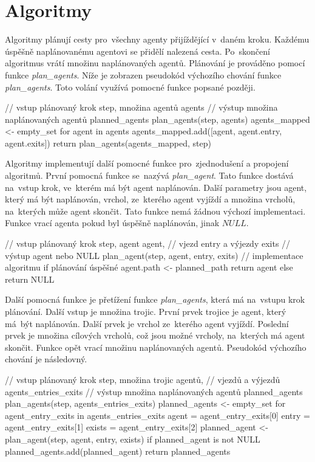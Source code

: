 \chapter{Algoritmy}\label{ch:algoritmy}

Algoritmy plánují cesty pro~všechny agenty přijíždějící v~daném kroku.
Každému úspěšně naplánovanému agentovi se přidělí nalezená cesta.
Po~skončení algoritmus vrátí množinu naplánovaných agentů.
Plánování je prováděno pomocí funkce \emph{plan\_agents}.
Níže je zobrazen pseudokód výchozího chování funkce \emph{plan\_agents}.
Toto volání využívá pomocné funkce popsané později.
\begin{code}[xrightmargin=6em]
// vstup plánovaný krok step, množina agentů agents
// výstup množina naplánovaných agentů planned_agents
plan_agents(step, agents)
    agents_mapped <- empty_set
    for agent in agents
      agents_mapped.add([agent, agent.entry, agent.exits])
    return plan_agents(agents_mapped, step)
\end{code}

Algoritmy implementují další pomocné funkce pro~zjednodušení a propojení algoritmů.
První pomocná funkce se~nazývá \emph{plan\_agent}.
Tato funkce dostává na~vstup krok, ve~kterém má být agent naplánován.
Další parametry jsou agent, který má být naplánován, vrchol,
ze~kterého agent vyjíždí a množina vrcholů, na~kterých může agent skončit.
Tato funkce nemá žádnou výchozí implementaci.
Funkce vrací agenta pokud byl úspěšně naplánován, jinak $NULL$.
\begin{code}[xrightmargin=14em]
// vstup plánovaný krok step, agent agent,
// vjezd entry a výjezdy exits
// výstup agent nebo NULL
plan_agent(step, agent, entry, exits)
  // implementace algoritmu
  if plánování úspěšné
    agent.path <- planned_path
    return agent
  else
    return NULL
\end{code}

Další pomocná funkce je přetížení funkce \emph{plan\_agents}, která má na~vstupu krok plánování.
Další vstup je množina trojic.
První prvek trojice je agent, který má~být naplánován.
Další prvek je vrchol ze~kterého agent vyjíždí.
Poslední prvek je množina cílových vrcholů, což jsou možné vrcholy, na~kterých má agent skončit.
Funkce opět vrací množinu naplánovaných agentů.
Pseudokód výchozího chování je následovný.
\begin{code}[xrightmargin=6em]
// vstup plánovaný krok step, množina trojic agentů,
// vjezdů a výjezdů agents_entries_exits
// výstup množina naplánovaných agentů planned_agents
plan_agents(step, agents_entries_exits)
  planned_agents <- empty_set
  for agent_entry_exits in agents_entries_exits
    agent = agent_entry_exits[0]
    entry = agent_entry_exits[1]
    exists = agent_entry_exits[2]
    planned_agent <- plan_agent(step, agent, entry, exists)
    if planned_agent is not NULL
      planned_agents.add(planned_agent)
  return planned_agents
\end{code}










